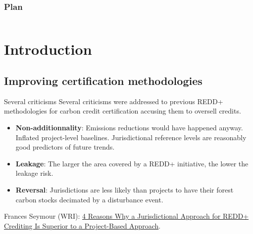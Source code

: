 \documentclass[10pt,table,dvipsnames,compress]{beamer}
\newif\ifplacelogo %
\begin{document}

\placelogotrue
\begin{frame}
  \frametitle{Plan}
  \begin{columns}[c]
    \begin{column}{0.5\textwidth}
      \tableofcontents[sections=1]
      \vspace{0.5cm}
      \tableofcontents[sections=2]
    \end{column}
    \begin{column}{0.5\textwidth}
        \tableofcontents[sections=3]
        \vspace{0.5cm}
        \tableofcontents[sections=4]
    \end{column}
  \end{columns}
\end{frame}
\placelogofalse

\section{Introduction}
\label{sec:orga12b708}

\subsection{Improving certification methodologies}
\label{sec:org13825aa}

\begin{frame}[label={sec:org6acac64}]{Several criticisms}
Several criticisms were addressed to previous REDD+ methodologies for carbon credit certification accusing them to oversell credits.

\begin{itemize}
\item \textbf{Non-additionnality}: Emissions reductions would have happened anyway. Inflated project-level baselines. Jurisdictional reference levels are reasonably good predictors of future trends.
\item \textbf{Leakage}: The larger the area covered by a REDD+ initiative, the lower the leakage risk.
\item \textbf{Reversal}: Jurisdictions are less likely than projects to have their forest carbon stocks decimated by a disturbance event.
\end{itemize}

Frances Seymour (WRI): \href{https://www.wri.org/insights/insider-4-reasons-why-jurisdictional-approach-redd-crediting-superior-project-based}{4 Reasons Why a Jurisdictional Approach for REDD+ Crediting Is Superior to a Project-Based Approach}.
\end{frame}
\end{document}
